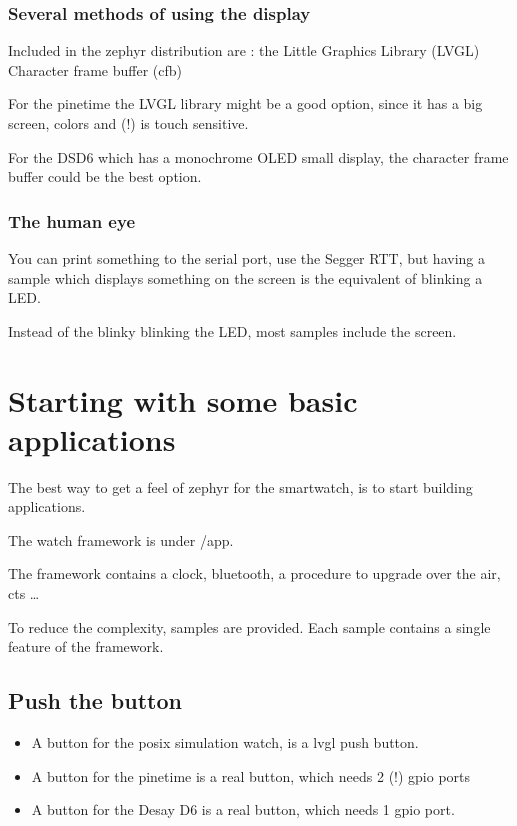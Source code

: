 \documentclass[letterpaper,10pt,english]{sphinxmanual}
\begin{document}
\subsection{Several methods of using the display}
\label{\detokenize{display:several-methods-of-using-the-display}}
Included in the zephyr distribution are :
\sphinxhyphen{} the Little Graphics Library  (LVGL)
\sphinxhyphen{} Character frame buffer (cfb)

For the pinetime the LVGL library might be a good option, since it has a big screen, colors and (!) is touch sensitive.

For the DS\sphinxhyphen{}D6 which has a monochrome OLED small display, the character frame buffer could be the best option.


\subsection{The human eye}
\label{\detokenize{display:the-human-eye}}
You can print something to the serial port, use the Segger RTT, but having a sample which displays something on the screen is the equivalent of blinking a LED.

Instead of the blinky blinking the LED, most samples include the screen.


\chapter{Starting with some basic applications}
\label{\detokenize{basicapplications:starting-with-some-basic-applications}}\label{\detokenize{basicapplications::doc}}
The best way to get a feel of zephyr for the smartwatch, is to start building applications.

The watch framework is under /app.

The framework contains a clock, bluetooth, a procedure to upgrade over the air, cts  …

To reduce the complexity, samples are provided.
Each sample contains a single feature of the framework.


\section{Push the button}
\label{\detokenize{basicapplications:push-the-button}}\begin{itemize}
\item {} 
A button for the posix simulation watch, is a lvgl push button.

\item {} 
A button for the pinetime is a real button, which needs 2 (!) gpio ports

\item {} 
A button for the Desay D6 is a real button, which needs 1 gpio port.

\end{itemize}
\end{document}
